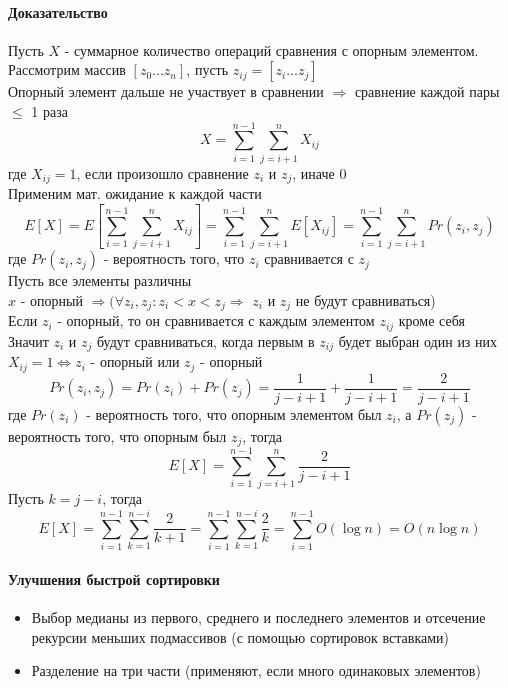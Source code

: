 \documentclass[a4paper,10pt]{article}
\begin{document}
	\paragraph{Доказательство}
	Пусть $X$ - суммарное количество операций сравнения с опорным элементом. Рассмотрим массив
	$[z_{0}...z_{n}]$, пусть $z_{ij} = [z_{i}...z_{j}]$ \\
	Опорный элемент дальше не участвует в сравнении $\Rightarrow$ сравнение каждой пары $\leq$ 1 раза \\
	\[
	X = \sum_{i=1}^{n-1} \sum_{j=i+1}^{n} X_{ij}
	\] 
	где $X_{ij} = 1$, если произошло сравнение $z_{i}$ и $z_{j}$, иначе 0 \\
	Применим мат. ожидание к каждой части
	\[ 
	E[X] = E[\sum_{i=1}^{n-1} \sum_{j=i+1}^{n} X_{ij}] = \sum_{i=1}^{n-1} \sum_{j=i+1}^{n} E[X_{ij}] = \sum_{i=1}^{n-1} \sum_{j=i+1}^{n} Pr(z_{i}, z_{j})
	\]		
	где $Pr(z_{i}, z_{j})$ - вероятность того, что $z_{i}$ сравнивается с $z_{j}$ \\
	Пусть все элементы различны \\
	$x$ - опорный $\Rightarrow (\forall z_{i}, z_{j} \colon z_{i} < x < z_{j} \Rightarrow$ $z_{i}$ и $z_{j}$ не будут сравниваться)  \\
	Если $z_{i}$ - опорный, то он сравнивается с каждым элементом $z_{ij}$ кроме себя \\
	Значит $z_{i}$ и $z_{j}$ будут сравниваться, когда первым в $z_{ij}$ будет выбран один из них \\
	$X_{ij} = 1 \Leftrightarrow z_{i}$ - опорный или $z_{j}$ - опорный
	\[ 
	Pr(z_{i}, z_{j}) = Pr(z_{i}) + Pr(z_{j}) = \frac{1}{j-i+1} + \frac{1}{j-i+1} = \frac{2}{j-i+1}
	\]
	где $Pr(z_{i})$ - вероятность того, что опорным элементом был $z_{i}$, а $Pr(z_{j})$ - вероятность того, что опорным был $z_{j}$, тогда
	\[
	E[X] =  \sum_{i=1}^{n-1} \sum_{j=i+1}^{n} \frac{2}{j-i+1}
	\]
	Пусть $k = j - i$, тогда
	\[
	E[X] =  \sum_{i=1}^{n-1} \sum_{k=1}^{n-i} \frac{2}{k+1} = \sum_{i=1}^{n-1} \sum_{k=1}^{n-i} \frac{2}{k} = \sum_{i=1}^{n-1} O(\log{n}) = O(n\log{n})
	\]
	\paragraph{Улучшения быстрой сортировки}
	\begin{itemize}
		\item Выбор медианы из первого, среднего и последнего элементов и отсечение рекурсии меньших подмассивов (с помощью сортировок вставками)
		\item Разделение на три части (применяют, если много одинаковых элементов)
	\end{itemize}
\end{document}
